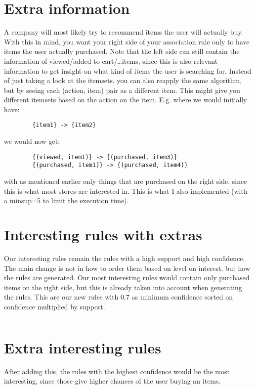 \documentclass{article}
\begin{document}
    \section{Extra information}
    A company will most likely try to recommend items the user will actually buy.
    With this in mind, you want your right side of your association rule only to have items the user actually purchased.
    Note that the left side can still contain the information of viewed/added to cart/\ldots items, since this is also relevant information to get insight on what kind of items the user is searching for.
    Instead of just taking a look at the itemsets, you can also reapply the same algorithm, but by seeing each (action, item) pair as a different item.
    This might give you different itemsets based on the action on the item.
    E.g. where we would initially have:
    \begin{verbatim}
        {item1} -> {item2}
    \end{verbatim}
    we would now get:
    \begin{verbatim}
        {(viewed, item1)} -> {(purchased, item3)}
        {(purchased, item1)} -> {(purchased, item4)}
    \end{verbatim}
    with as mentioned earlier only things that are purchased on the right side, since this is what most stores are interested in.
    This is what I also implemented (with a minsup=5 to limit the execution time).

    \section{Interesting rules with extras}
    Our interesting rules remain the rules with a high support and high confidence.
    The main change is not in how to order them based on level on interest, but how the rules are generated.
    Our most interesting rules would contain only purchased items on the right side, but this is already taken into account when generating the rules.
    This are our new rules with 0.7 as minimum confidence sorted on confidence multiplied by support.
    \begin{verbatim}

    \end{verbatim}



    \section{Extra interesting rules}
    After adding this, the rules with the highest confidence would be the most interesting, since those give higher chances of the user buying an items.
\end{document}
